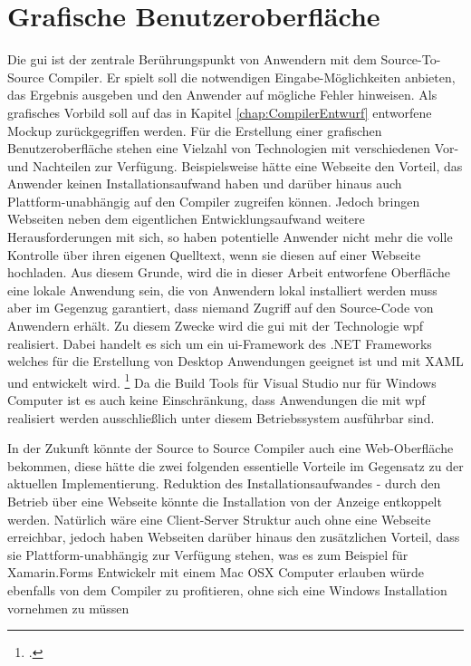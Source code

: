 \section{Grafische Benutzeroberfläche}
Die \ac{gui} ist der zentrale Berührungspunkt von Anwendern mit dem Source-To-Source Compiler.  Er spielt soll die notwendigen Eingabe-Möglichkeiten anbieten,  das Ergebnis ausgeben und den Anwender auf mögliche Fehler hinweisen.  Als grafisches Vorbild soll auf das in Kapitel \ref{chap:CompilerEntwurf} entworfene Mockup zurückgegriffen werden.  Für die Erstellung einer grafischen Benutzeroberfläche stehen eine Vielzahl von Technologien mit verschiedenen Vor- und Nachteilen zur Verfügung.  Beispielsweise hätte eine Webseite den Vorteil,  das Anwender keinen Installationsaufwand haben und darüber hinaus auch Plattform-unabhängig auf den Compiler zugreifen können.  Jedoch bringen Webseiten neben dem eigentlichen Entwicklungsaufwand weitere Herausforderungen mit sich,  so haben potentielle Anwender nicht mehr die volle Kontrolle über ihren eigenen Quelltext, wenn sie diesen auf einer Webseite hochladen.  
Aus diesem Grunde,  wird die in dieser Arbeit entworfene Oberfläche eine lokale Anwendung sein,  die von Anwendern lokal installiert werden muss aber im Gegenzug garantiert,  dass niemand Zugriff auf den Source-Code von Anwendern erhält.  Zu diesem Zwecke wird die \ac{gui} mit der Technologie \ac{wpf} realisiert.  Dabei handelt es sich um ein \ac{ui}-Framework des .NET Frameworks welches für die Erstellung von Desktop Anwendungen geeignet ist und mit XAML und \Csharp entwickelt wird.  \footcite[Vgl.][S. 1f]{Wenger2012} Da die Build Tools für Visual Studio nur für Windows Computer ist es auch keine Einschränkung,  dass Anwendungen die mit \ac{wpf} realisiert werden ausschließlich unter diesem Betriebssystem ausführbar sind.

In der Zukunft könnte der Source to Source Compiler auch eine Web-Oberfläche bekommen,  diese hätte die zwei folgenden essentielle Vorteile im Gegensatz zu der aktuellen Implementierung.  Reduktion des Installationsaufwandes - durch den Betrieb über eine Webseite könnte die Installation von der Anzeige entkoppelt werden.  Natürlich wäre eine Client-Server Struktur auch ohne eine Webseite erreichbar,  jedoch haben Webseiten darüber hinaus den zusätzlichen Vorteil,  dass sie Plattform-unabhängig zur Verfügung stehen,  was es zum Beispiel für Xamarin.Forms Entwickelr mit einem Mac OSX Computer erlauben würde ebenfalls von dem Compiler zu profitieren, ohne sich eine Windows Installation vornehmen zu müssen

